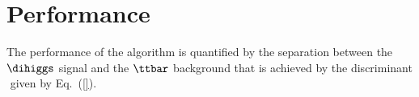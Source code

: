\section{Performance}
\label{sec:performance}

The performance of the algorithm is quantified by the separation between the $\dihiggs$ signal and the $\ttbar$ background that is achieved by the discriminant $$ given by Eq.~(\ref{}).
